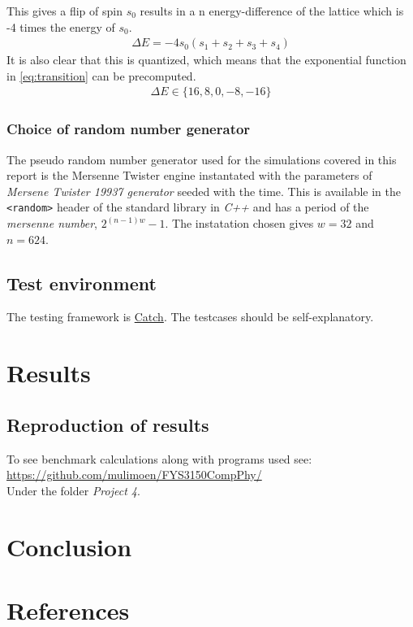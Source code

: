 \documentclass[11pt,a4paper,english]{article}
\numberwithin{equation}{section}
\begin{document}
This gives a flip of spin $s_0$ results in a n
energy-difference of the lattice which is
 -4 times the energy of $s_0$.
\begin{gather}
\Delta E = -4s_0(s_1 + s_2 + s_3 + s_4)
\end{gather}
It is also clear that this is quantized, which means that the 
exponential function in \eqref{eq:transition} can be precomputed.
\begin{gather}
\Delta E \in \{16, 8, 0, -8, -16\}
\end{gather}




\subsubsection{Choice of random number generator}
The pseudo random number generator used for the simulations covered in 
this report is the Mersenne Twister engine
instantated with the parameters of 
\emph{Mersene Twister 19937 generator} seeded with the time.
This is available in the \texttt{<random>} header of the standard
library in \emph{C++} and has a period of the \emph{mersenne number}, $2^{(n-1)w}-1$.
The instatation chosen gives $w=32$ and $n=624$.	

\subsection{Test environment}

The testing framework is \href{https://github.com/philsquared/Catch}{Catch}.
The testcases should be self-explanatory.


\section{Results}

\subsection{Reproduction of results}

To see benchmark calculations along with programs used see:\\
\url{https://github.com/mulimoen/FYS3150CompPhy/}\\
Under the folder \emph{Project 4}.

\section{Conclusion}

\section{References}
\end{document}

